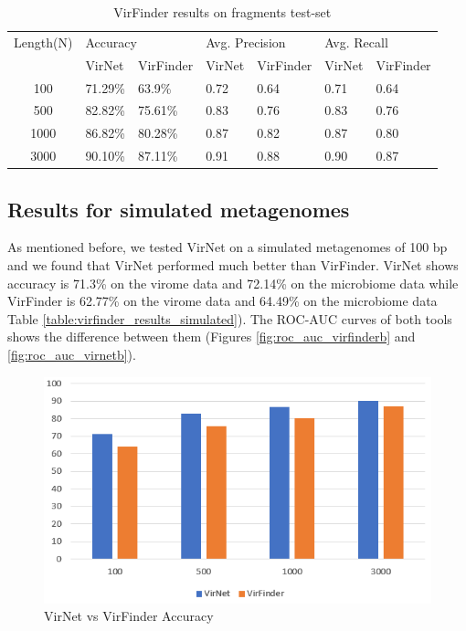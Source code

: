\documentclass[conference]{IEEEtran}
\begin{document}
\begin{table}[!htbp]
	\centering
	\begin{tabular}{||c l l l l l l||} 
		Length(N) &	\multicolumn{2}{l}{Accuracy} & \multicolumn{2}{l}{Avg. Precision} & \multicolumn{2}{l}{Avg. Recall}\\ [0.5ex] 
		& VirNet & VirFinder & VirNet & VirFinder & VirNet & VirFinder \\
		\hline\hline
		100 & 71.29\% &	63.9\%	& 0.72 & 0.64 & 0.71 & 0.64 \\
		500 & 82.82\% &	75.61\% & 0.83 &	0.76 & 0.83 & 0.76\\
		1000 & 86.82\% &	80.28\% &  0.87 & 0.82 & 0.87 & 0.80 \\
		3000 & 90.10\% &	87.11\% & 0.91 & 0.88 & 0.90 & 0.87 \\[1ex]
	\end{tabular}
	\caption{VirFinder results on fragments test-set}
	\label{table:virfinder_results}
\end{table}

\subsection{Results for simulated metagenomes}

As mentioned before, we tested VirNet on a simulated metagenomes of 100 bp and we found that VirNet performed much better than VirFinder. VirNet shows accuracy is 71.3\% on the virome data and 72.14\% on the microbiome data while VirFinder is 62.77\% on the virome data and 64.49\% on the microbiome data Table \ref{table:virfinder_results_simulated}). The ROC-AUC curves of both tools shows the difference between them (Figures \ref{fig:roc_auc_virfinderb} and \ref{fig:roc_auc_virnetb}).

\begin{figure}
	\centering
	\includegraphics[width=\columnwidth]{imgs/accuracy_graph.PNG}
	\caption{VirNet vs VirFinder Accuracy}
	\label{fig:accuracy_graph}
\end{figure}
\end{document}
